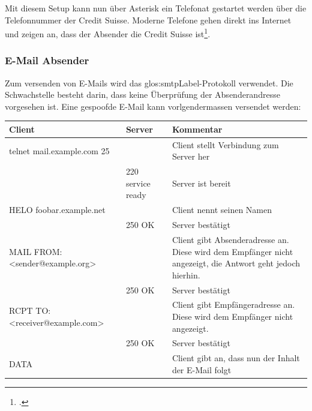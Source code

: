Mit diesem Setup kann nun über Asterisk ein Telefonat gestartet werden über die Telefonnummer der Credit Suisse. Moderne Telefone gehen direkt ins Internet und zeigen an, dass der Absender die Credit Suisse ist\footcite{Caller_ID_Spoofing_w_Asterisk_Allan_Feid_2015-05-18}.

\subsubsection{E-Mail Absender}
Zum versenden von E-Mails wird das \gls{glos:smtpLabel}-Protokoll verwendet. Die Schwachstelle besteht darin, dass keine Überprüfung der Absenderandresse vorgesehen ist. Eine gespoofde E-Mail kann vorlgendermassen versendet werden:
\begin{center}
    \begin{tabular}{ | p{5cm} | p{2cm} | p{6cm} |}
	    \hline
	    
	    \textbf{Client} & 
	    \textbf{Server} & 
	    \textbf{Kommentar} \\ \hline
		
		telnet mail.example.com 25 &  
		& 
		Client stellt Verbindung zum Server her \\ \hline
		
		& 220 service ready & Server ist bereit\\ \hline
		
		HELO foobar.example.net &  
		& 
		Client nennt seinen Namen\\ \hline
		
		& 250 OK & Server bestätigt\\ \hline
		
		MAIL FROM:<sender@example.org> &  
		& 
		\parbox[t]{6cm}{Client gibt Absenderadresse an. \\ Diese wird dem Empfänger nicht angezeigt, die Antwort geht jedoch hierhin.} \\ \hline
		
		& 250 OK & Server bestätigt\\ \hline
		
		RCPT TO:<receiver@example.com> &  
		& 
		\parbox[t]{6cm}{Client gibt Empfängeradresse an. \\ Diese wird dem Empfänger nicht angezeigt.} \\ \hline
		
		& 250 OK & Server bestätigt\\ \hline
		
		DATA &  
		& 
		Client gibt an, dass nun der Inhalt der E-Mail folgt\\ \hline
		

\end{tabular}
\end{center}

